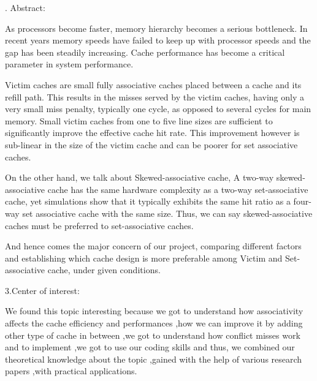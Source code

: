 \documentclass[12pt]{article}
\begin{document}
\vspace{\baselineskip}
{\fontsize{22pt}{26.4pt}. Abstract:\par}\par

{\fontsize{16pt}{19.2pt}\selectfont As processors become faster, memory hierarchy becomes a serious bottleneck. In recent years memory speeds have failed to keep up with processor speeds and the gap has been steadily increasing. Cache performance has become a critical parameter in system performance.\par}\par

{\fontsize{16pt}{19.2pt}\selectfont Victim caches are small fully associative caches placed between a cache and its refill path. This results in the misses served by the victim caches, having only a very small miss penalty, typically one cycle, as opposed to several cycles for main memory. Small victim caches from one to five line sizes are sufficient to significantly improve the effective cache hit rate. This improvement however is sub-linear in the size of the victim cache and can be poorer for set associative caches.\par}\par

{\fontsize{16pt}{19.2pt}\selectfont On the other hand, we talk about Skewed-associative cache, A two-way skewed-associative cache has the same hardware complexity as a two-way set-associative cache, yet simulations show that it typically exhibits the same hit ratio as a four-way set associative cache with the same size. Thus, we can say skewed-associative caches must be preferred to set-associative caches.\par}\par

{\fontsize{16pt}{19.2pt}\selectfont And hence comes the major concern of our project, comparing different factors and establishing which cache design is more preferable among Victim and Set-associative cache, under given conditions. \par}\par

{\fontsize{22pt}{26.4pt}\selectfont 3.Center of interest:\par}\par

{\fontsize{16pt}{19.2pt}\selectfont We found this topic interesting because we got to understand how associativity affects the cache efficiency and performances ,how we can improve it by adding other type of cache in between ,we got to understand how conflict misses work and to implement ,we got to use our coding skills and thus, we combined our theoretical knowledge about the topic ,gained with the help of various research papers ,with practical applications.\par}\par
\end{document}
